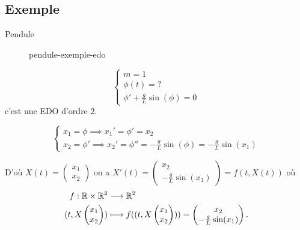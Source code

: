 \subsection{Exemple}
\begin{eg}
   Pendule 
\begin{figure}[H]
    \centering
    \caption{pendule-exemple-edo}
    \label{fig:pendule-exemple-edo}
\end{figure}
\[
\begin{cases}
    m = 1\\
    \phi(t) = ?\\
    \phi' + \frac{g}{L}\sin(\phi) = 0
\end{cases}
\] 
c'est une EDO d'ordre $2$.

 \[
\begin{cases}
    x_1 = \phi \implies x_1' = \phi' = x_2\\
    x_2 = \phi' \implies x_2' = \phi'' = -\frac{g}{L}\sin(\phi) = -\frac{g}{L}\sin(x_1)
\end{cases}
\] 

D'où $X(t) = \begin{pmatrix} x_1 \\ x_2 \end{pmatrix} $ on a $X'(t) = \begin{pmatrix} x_2 \\ -\frac{g}{L}\sin(x_1) \end{pmatrix} = f(t, X(t)) $ 
où \begin{align*}
    f: \mathbb{R} \times \mathbb{R}^2 &\longrightarrow \mathbb{R}^2 \\
    (t, X\begin{pmatrix} x_1\\x_2 \end{pmatrix} ) &\longmapsto f((t, X\begin{pmatrix} x_1\\x_2 \end{pmatrix} )) = \begin{pmatrix} x_2 \\ -\frac{g}{L}\sin(x_1) \end{pmatrix} 
.\end{align*}

\end{eg}
